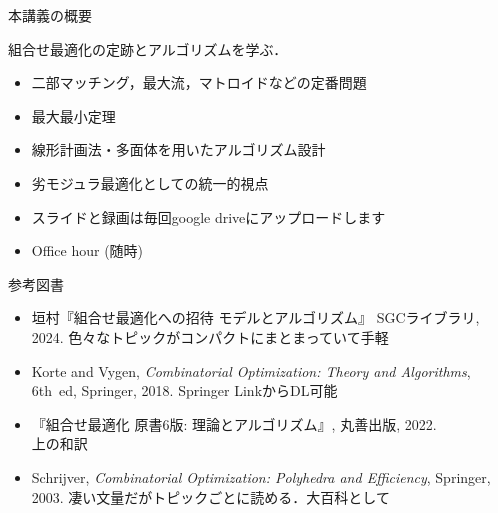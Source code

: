 \begin{frame}{本講義の概要}
    
    組合せ最適化の\alert{定跡}と\alert{アルゴリズム}を学ぶ．
    \begin{itemize}
        \item 二部マッチング，最大流，マトロイドなどの定番問題
        \item 最大最小定理
        \item 線形計画法・多面体を用いたアルゴリズム設計
        \item 劣モジュラ最適化としての統一的視点
    \end{itemize}

    \bigskip
    \begin{itemize}
        \item スライドと録画は毎回google driveにアップロードします
        \item Office hour (随時)
    \end{itemize}
\end{frame}



\begin{frame}{参考図書}
    \small
    \begin{itemize}
        \item 垣村『組合せ最適化への招待 モデルとアルゴリズム』 SGCライブラリ, 2024. {\color{gray} \dotfill 色々なトピックがコンパクトにまとまっていて手軽}
    \end{itemize}

    \bigskip
    \begin{itemize}
        \item Korte and Vygen, \emph{Combinatorial Optimization: Theory and Algorithms}, 6th~ed, Springer, 2018.  {\color{gray} \dotfill Springer LinkからDL可能}
    
        \item 『組合せ最適化 原書6版: 理論とアルゴリズム』, 丸善出版, 2022. \\ {\color{gray} \dotfill 上の和訳}

        \item Schrijver, \emph{Combinatorial Optimization: Polyhedra and Efficiency}, Springer, 2003. {\color{gray} \dotfill 凄い文量だがトピックごとに読める．大百科として}

    \end{itemize}
\end{frame}
